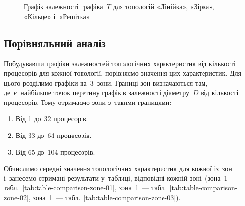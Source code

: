 \documentclass[
	a4paper,
	oneside,
	BCOR = 10mm,
	DIV = 12,
	12pt,
	headings = normal,
]{scrartcl}
\begin{document}
\begin{figure}[!htbp]
					\caption{Графік залежності трафіка~$T$ для топологій «Лінійка», «Зірка», «Кільце» і~«Решітка»}
					\label{fig:plot-comparison-traffic}
				\end{figure}

		\subsection{Порівняльний аналіз}
			Побудувавши графіки залежностей топологічних характеристик від кількості процесорів для кожної топології, порівняємо значення цих характеристик. Для цього розділимо графіки на~3~зони. Границі зон визначаються там, де~є~найбільше точок перетину графіків залежності діаметру~$D$ від кількості процесорів. Тому отримаємо зони з~такими границями:
			\begin{enumerate}
				\item Від 1 до~32 процесорів.
				\item Від 33 до~64 процесорів.
				\item Від 65 до~104 процесорів.
			\end{enumerate}
			Обчислимо середні значення топологічних характеристик для кожної із~зон і~занесемо отримані результати у~таблиці, відповідні кожній зоні~(зона~1~— табл.~\ref{tab:table-comparison-zone-01}, зона~1~— табл.~\ref{tab:table-comparison-zone-02}, зона~1~— табл.~\ref{tab:table-comparison-zone-03}).
\end{document}

